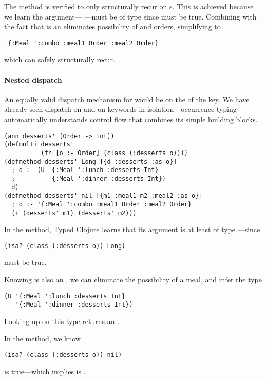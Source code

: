 The  method is verified to only structurally recur
on s. This is achieved because we learn the argument---  ---must %
be of type
since
must be true. Combining 
with the fact that  is an 
eliminates possibility of  and 
orders, simplifying  to
\begin{verbatim}
'{:Meal ':combo :meal1 Order :meal2 Order}
\end{verbatim}
which can safely structurally recur.


\paragraph{Nested dispatch}
An equally valid dispatch mechanism for 
would be on the  of the  key.
We have already seen dispatch on  and on keywords
in isolation---occurrence typing automatically understands
control flow that combines its simple building blocks.

\begin{verbatim}
(ann desserts' [Order -> Int])
(defmulti desserts' 
          (fn [o :- Order] (class (:desserts o))))
(defmethod desserts' Long [{d :desserts :as o}] 
  ; o :- (U '{:Meal ':lunch :desserts Int}
  ;         '{:Meal ':dinner :desserts Int})
  d)
(defmethod desserts' nil [{m1 :meal1 m2 :meal2 :as o}]
  ; o :- '{:Meal ':combo :meal1 Order :meal2 Order}
  (+ (desserts' m1) (desserts' m2)))
\end{verbatim}
%

In the  method, Typed Clojure learns that
its argument is at least of type ---since
\begin{verbatim}
(isa? (class (:desserts o)) Long)
\end{verbatim}
must be true.

Knowing  is also an
, we can eliminate the possibility of
a  meal, and infer the type
\begin{verbatim}
(U '{:Meal ':lunch :desserts Int}
   '{:Meal ':dinner :desserts Int})
\end{verbatim}
Looking up  on this type returns an .

In the  method, we know
\begin{verbatim}
(isa? (class (:desserts o)) nil)
\end{verbatim}
is true---which implies  is .

